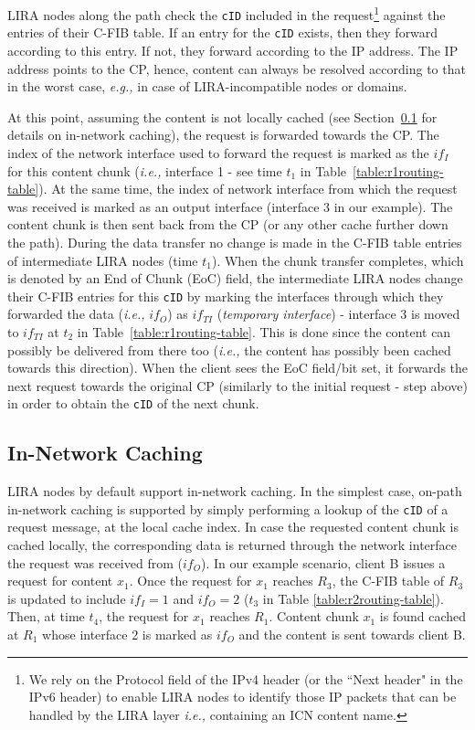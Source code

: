 \documentclass{sig-alternate}
\newcommand*\circled[1]{\tikz[baseline=(char.base)]{
            \node[shape=circle,draw,inner sep=2pt] (char) {#1};}}
\newcommand{\ie}{{\em i.e.,\/ }}
\newcommand{\eg}{{\em e.g.,\/ }}
\begin{document}
\circled{6} LIRA nodes along the path check the \texttt{cID} included in the request\footnote{We rely on the Protocol field of the IPv4 header (or the ``Next header" in the IPv6 header) to enable LIRA nodes to identify those IP packets that can be handled by the LIRA layer \ie containing an ICN content name.} against the entries of their C-FIB table. If an entry for the \texttt{cID} exists, then they forward according to this entry. If not, they forward according to the IP address. The IP address points to the CP, hence, content can always be resolved according to that in the worst case, \eg in case of LIRA-incompatible nodes or domains.

At this point, assuming the content is not locally cached (see Section~\ref{caching} for details on in-network caching), the request is forwarded towards the CP. The index of the network interface used to forward the request is marked as the $if_I$ for this content chunk (\ie interface 1 - see time $t_1$ in Table~\ref{table:r1routing-table}). At the same time, the index of network interface from which the request was received is marked as an output interface (interface 3 in our example). The content chunk is then sent back from the CP (or any other cache further down the path). During the data transfer no change is made in the C-FIB table entries of intermediate LIRA nodes (time $t_1$). When the chunk transfer completes, which is denoted by an End of Chunk (EoC) field, the intermediate LIRA nodes change their C-FIB entries for this \texttt{cID} by marking the interfaces through which they forwarded the data (\ie $if_{O}$) as $if_{TI}$ (\textit{temporary interface}) - interface 3 is moved to $if_{TI}$ at $t_2$ in Table~\ref{table:r1routing-table}. This is done since the content can possibly be delivered from there too (\ie the content has possibly been cached towards this direction).
When the client sees the EoC field/bit set, it forwards the next request towards the original CP (similarly to the initial request - step \circled{3} above) in order to obtain the \texttt{cID} of the next chunk.




\subsection{In-Network Caching}\label{caching}

LIRA nodes by default support in-network caching. In the simplest case, on-path in-network caching is supported by simply performing a lookup of the \texttt{cID} of a request message, at the local cache index. In case the requested content chunk is cached locally, the corresponding data is returned through the network interface the request was received from ($if_O$). In our example scenario, client B issues a request for content $x_1$. Once the request for $x_1$ reaches $R_3$, the C-FIB table of $R_3$ is updated to include $if_I=1$ and $if_O=2$ ($t_3$ in Table \ref{table:r2routing-table}). Then, at time $t_4$, the request for $x_1$ reaches $R_1$. Content chunk $x_1$ is found cached at $R_1$ whose interface 2 is marked as $if_O$ and the content is sent towards client B.
\end{document}
